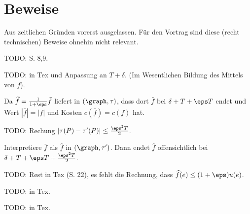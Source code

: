 \section{Beweise}

Aus zeitlichen Gründen vorerst ausgelassen. Für den Vortrag sind diese (recht technischen)
Beweise ohnehin nicht relevant.

\begin{standaloneProof}
    TODO: S. 8,9.
\end{standaloneProof}

\begin{standaloneProof}
    TODO: in Tex und Anpassung an $T + \delta$.
    (Im Wesentlichen Bildung des Mittels von $f$).
\end{standaloneProof}

\begin{standaloneProof}
    Da $\widetilde{f} = \frac{1}{1 + \eps} \bar{f}$ liefert 
    in $(\graph, \tau)$, dass dort $\bar{f}$ bei $\delta + T + \eps T$ endet
    und Wert $|\bar{f}| = |f|$ und Kosten $c(\bar{f}) = c(f)$ hat.

    TODO: Rechung $|\tau(P) - \tau'(P)| \leq \frac{\eps^2T}{2}$.

    Interpretiere $\bar{f}$ als $\widehat{f}$ in $(\graph, \tau')$. Dann endet
    $\widehat{f}$ offensichtlich bei $\delta + T + \eps T + \frac{\eps^2T}{2}$.

    TODO: Rest in Tex (S. 22), es fehlt die Rechnung, dass
        $\widehat{f}(e) \leq (1+\eps)u(e)$.
\end{standaloneProof}

\begin{standaloneProof}
    TODO: in Tex.
\end{standaloneProof}

\begin{standaloneProof}
    TODO: in Tex.
\end{standaloneProof}

\endinput
